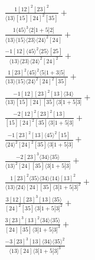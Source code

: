 \documentclass[varwidth, border=5pt]{standalone}
\begin{document}
\begin{my}
$\begin{gathered}
\scriptscriptstyle\frac{1[12]^2[23]^2}{⟨13⟩[15][24]^2[35]}+\\
\scriptscriptstyle\frac{1⟨45⟩^3⟨2|1+5|2]}{⟨13⟩⟨15⟩⟨23⟩⟨24⟩^2[24]}+\\
\scriptscriptstyle\frac{-1[12]⟨45⟩^2⟨25⟩[25]}{⟨13⟩⟨23⟩⟨24⟩^2[24]^2}+\\
\scriptscriptstyle\frac{1[23]^2⟨45⟩^2⟨5|1+3|5]}{⟨13⟩⟨15⟩⟨24⟩^2[24]^2[35]}+\\
\scriptscriptstyle\frac{-1[12][23]^2[13]⟨34⟩}{⟨13⟩[15][24][35]⟨3|1+5|3]}+\\
\scriptscriptstyle\frac{-2[12]^2[23]^2[13]}{[15][24]^2[35]⟨3|1+5|3]}+\\
\scriptscriptstyle\frac{-1[23]^2[13]⟨45⟩^2[15]}{⟨24⟩^2[24]^2[35]⟨3|1+5|3]}+\\
\scriptscriptstyle\frac{-2[23]^3⟨34⟩⟨35⟩}{⟨13⟩^2[24][35]⟨3|1+5|3]}+\\
\scriptscriptstyle\frac{1[23]^2⟨35⟩⟨34⟩⟨14⟩[13]^2}{⟨13⟩⟨24⟩[24][35]⟨3|1+5|3]^2}+\\
\scriptscriptstyle\frac{3[12][23]^3[13]⟨35⟩}{[24]^2[35]⟨3|1+5|3]^2}+\\
\scriptscriptstyle\frac{3[23]^3[13]^2⟨34⟩⟨35⟩}{[24][35]⟨3|1+5|3]^3}+\\
\scriptscriptstyle\frac{-3[23]^3[13]⟨34⟩⟨35⟩^2}{⟨13⟩[24]⟨3|1+5|3]^3}\phantom{+}
\end{gathered}$
\end{my}
\end{document}
